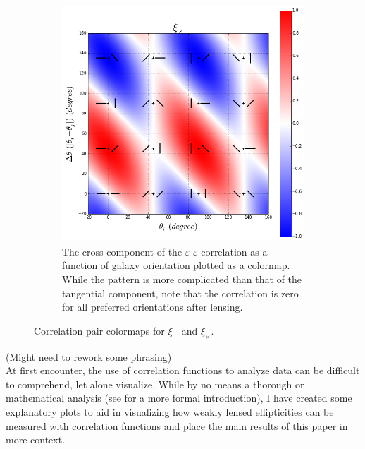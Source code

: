 \documentclass[%
 reprint,
 amsmath,amssymb,
 aps,nofootinbib
]{revtex4-1}
\begin{document}
\begin{figure}[!b]
\begin{subfigure}{0.425\textwidth}
        \includegraphics[width=\textwidth]{figs-swe/xix_colormap.png}
        \captionsetup{justification=raggedright,singlelinecheck=false}
        \caption{The cross component of the $\varepsilon$-$\varepsilon$ correlation as a function of galaxy orientation plotted as a colormap. While the pattern is more complicated than that of the tangential component, note that the correlation is zero for all preferred orientations after lensing.}
        \label{xix_colormap}
    \end{subfigure}
    \caption{Correlation pair colormaps for $\xi_+$ and $\xi_\times$.}
    \label{corr_colormaps}
\end{figure}

(Might need to rework some phrasing)\\

At first encounter, the use of correlation functions to analyze data can be difficult to comprehend, let alone visualize. While by no means a thorough or mathematical analysis (see \cite{correlation_functions} for a more formal introduction), I have created some explanatory plots to aid in visualizing how weakly lensed ellipticities can be measured with correlation functions and place the main results of this paper in more context.
\end{document}
